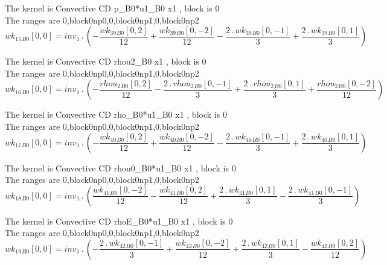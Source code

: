 \documentclass{article}
\begin{document}
\noindent The kernel is Convective CD p_B0*u1_B0 x1 , block is 0\\\noindent The ranges are 0,block0np0,0,block0np1,0,block0np2\\\begin{dmath}{wk_{15}{_{B0}}}[{0,0}] = inv_1 \,.\, \left(- \frac{{wk_{39}{_{B0}}}[{0,2}]}{12} + \frac{{wk_{39}{_{B0}}}[{0,-2}]}{12} - \frac{2 \,.\, {wk_{39}{_{B0}}}[{0,-1}]}{3} + \frac{2 \,.\, {wk_{39}{_{B0}}}[{0,1}]}{3}\right)\end{dmath}

\noindent The kernel is Convective CD rhou2_B0 x1 , block is 0\\\noindent The ranges are 0,block0np0,0,block0np1,0,block0np2\\\begin{dmath}{wk_{16}{_{B0}}}[{0,0}] = inv_1 \,.\, \left(- \frac{{rhou_{2}{_{B0}}}[{0,2}]}{12} - \frac{2 \,.\, {rhou_{2}{_{B0}}}[{0,-1}]}{3} + \frac{2 \,.\, {rhou_{2}{_{B0}}}[{0,1}]}{3} + \frac{{rhou_{2}{_{B0}}}[{0,-2}]}{12}\right)\end{dmath}

\noindent The kernel is Convective CD rho_B0*u1_B0 x1 , block is 0\\\noindent The ranges are 0,block0np0,0,block0np1,0,block0np2\\\begin{dmath}{wk_{17}{_{B0}}}[{0,0}] = inv_1 \,.\, \left(- \frac{{wk_{40}{_{B0}}}[{0,2}]}{12} + \frac{{wk_{40}{_{B0}}}[{0,-2}]}{12} - \frac{2 \,.\, {wk_{40}{_{B0}}}[{0,-1}]}{3} + \frac{2 \,.\, {wk_{40}{_{B0}}}[{0,1}]}{3}\right)\end{dmath}

\noindent The kernel is Convective CD rhou0_B0*u1_B0 x1 , block is 0\\\noindent The ranges are 0,block0np0,0,block0np1,0,block0np2\\\begin{dmath}{wk_{18}{_{B0}}}[{0,0}] = inv_1 \,.\, \left(\frac{{wk_{41}{_{B0}}}[{0,-2}]}{12} - \frac{{wk_{41}{_{B0}}}[{0,2}]}{12} + \frac{2 \,.\, {wk_{41}{_{B0}}}[{0,1}]}{3} - \frac{2 \,.\, {wk_{41}{_{B0}}}[{0,-1}]}{3}\right)\end{dmath}

\noindent The kernel is Convective CD rhoE_B0*u1_B0 x1 , block is 0\\\noindent The ranges are 0,block0np0,0,block0np1,0,block0np2\\\begin{dmath}{wk_{19}{_{B0}}}[{0,0}] = inv_1 \,.\, \left(- \frac{2 \,.\, {wk_{42}{_{B0}}}[{0,-1}]}{3} + \frac{{wk_{42}{_{B0}}}[{0,-2}]}{12} + \frac{2 \,.\, {wk_{42}{_{B0}}}[{0,1}]}{3} - \frac{{wk_{42}{_{B0}}}[{0,2}]}{12}\right)\end{dmath}
\end{document}
